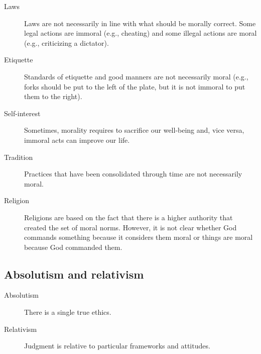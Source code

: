 \begin{description}
    \item[Laws]  
        Laws are not necessarily in line with what should be morally correct. Some legal actions are immoral (e.g., cheating) and some illegal actions are moral (e.g., criticizing a dictator).

    \item[Etiquette] 
        Standards of etiquette and good manners are not necessarily moral (e.g., forks should be put to the left of the plate, but it is not immoral to put them to the right).

    \item[Self-interest]  
        Sometimes, morality requires to sacrifice our well-being and, vice versa, immoral acts can improve our life.

    \item[Tradition]  
        Practices that have been consolidated through time are not necessarily moral.
    
    \item[Religion]  
        Religions are based on the fact that there is a higher authority that created the set of moral norms. However, it is not clear whether God commands something because it considers them moral or things are moral because God commanded them.
\end{description}




\subsection{Absolutism and relativism}

\begin{description}
    \item[Absolutism] 
        There is a single true ethics.

    \item[Relativism] 
        Judgment is relative to particular frameworks and attitudes.
\end{description}



